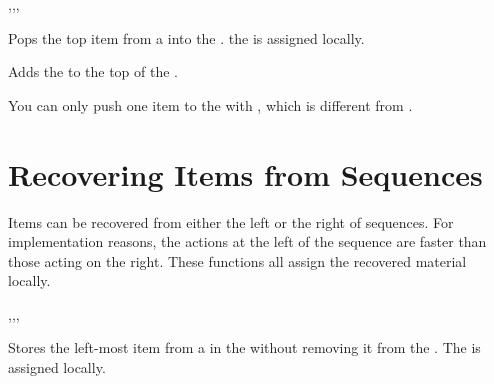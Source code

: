 \documentclass[oneside]{book}
\begin{document}
\begin{function}{\SeqPop,\SeqPopT,\SeqPopF,\SeqPopTF}
\begin{syntax}
  
   
   
    
\end{syntax}
Pops the top item from a  into the
. the  is assigned locally.
\begin{demohigh}
\SeqSetFromClist {}
\SeqPop \lTmpaSeq \lTmpaTl
\SeqVarJoin \lTmpaSeq {,}
\end{demohigh}
\end{function}

\begin{function}{\SeqPush}
\begin{syntax}
  
\end{syntax}
Adds the  to the top of the .
\begin{demohigh}
\SeqSetFromClist {}
\SeqPush {}
\SeqVarJoin \lTmpaSeq {|}
\end{demohigh}
You can only push one item to the  with ,
which is different from .
\end{function}

\section{Recovering Items from Sequences}

Items can be recovered from either the left or the right of sequences.
For implementation reasons, the actions at the left of the sequence are
faster than those acting on the right. These functions all assign the
recovered material locally.

\begin{function}{\SeqGetLeft,\SeqGetLeftT,\SeqGetLeftF,\SeqGetLeftTF}
\begin{syntax}
  
   
   
    
\end{syntax}
Stores the left-most item from a  in the
 without removing it from the
. The  is assigned locally.
\begin{demohigh}
\SeqSetFromClist {}
\SeqGetLeft \lTmpaSeq \lTmpaTl
\TlUse \lTmpaTl
\end{demohigh}
\end{function}
\end{document}
